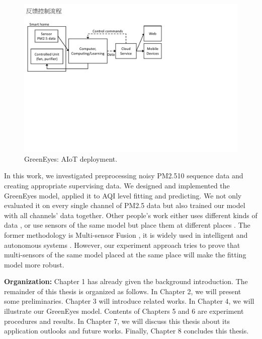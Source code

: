 
\begin{figure}[!htbp]
    \begin{center}
    \includegraphics[width=\linewidth]{graphs/greeneyes_aiot.pdf}
    \end{center}
    \caption{GreenEyes: AIoT deployment.}
    \label{fig:greeneyes_aiot}
\end{figure}

In this work, we investigated preprocessing noisy PM2.5\/10 sequence data and creating appropriate supervising data. We designed and implemented the GreenEyes model, applied it to AQI level fitting and predicting. We not only evaluated it on every single channel of PM2.5 data but also trained our model with all channels' data together. Other people's work either uses different kinds of data \cite{han2020joint}, or use sensors of the same model but place them at different places \cite{ray2016internet}. The former methodology is Multi-sensor Fusion \cite{wang2019multi}, it is widely used in intelligent and autonomous systems \cite{luo1989multisensor} \cite{hall1997introduction} \cite{wang2012towards} \cite{cai2020probabilistic}. However, our experiment approach tries to prove that multi-sensors of the same model placed at the same place will make the fitting model more robust.

\textbf{Organization:} Chapter 1 has already given the background introduction. The remainder of this thesis is organized as follows. In Chapter 2, we will present some preliminaries. Chapter 3 will introduce related works. In Chapter 4, we will illustrate our GreenEyes model. Contents of Chapters 5 and 6 are experiment procedures and results. In Chapter 7, we will discuss this thesis about its application outlooks and future works. Finally, Chapter 8 concludes this thesis.

